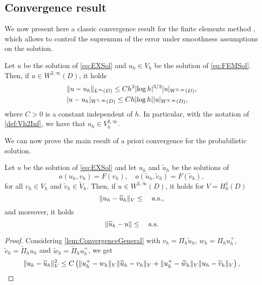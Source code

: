 \subsection{Convergence result}

We now present here a classic convergence result for the finite elements method \cite[Theorem 3.3.7]{Cia02}, which allows to control the supremum of the error under smoothness assumptions on the solution.
\begin{theorem}\label{thm:CiarletUniform} Let $u$ be the solution of \eqref{eq:EXSol} and $u_h \in V_h$ be the solution of \eqref{eq:FEMSol}. Then, if $u \in W^{2, \infty}(D)$, it holds
	\begin{equation}\label{eq:W1InfErr}
	\begin{aligned}
	&\lVert u - u_h\rVert_{L^\infty(D)} \leq C h^2 \lvert\log h\rvert^{3/2} \lvert u\rvert_{W^{2, \infty}(D)}, \\
	&\lvert u - u_h\rvert_{W^{1, \infty}(D)} \leq C h \lvert\log h\rvert \lvert u\rvert_{W^{2, \infty}(D)},
	\end{aligned}
	\end{equation}
	where $C > 0$ is a constant independent of $h$. In particular, with the notation of \cref{def:Vh2Inf}, we have that $u_h \in V_h^{2, \infty}$.
\end{theorem}

We can now prove the main result of a priori convergence for the probabilistic solution.
\begin{theorem}\label{thm:APriori} Let $u$ be the solution of \eqref{eq:EXSol} and let $u_h$ and $\widetilde u_h$ be the solutions of
	\begin{equation}
		a(u_h, v_h) = F(v_h), \quad a(\widetilde u_h, \widetilde v_h) = F(\widetilde v_h),
	\end{equation}
	for all $v_h \in V_h$ and $\widetilde v_h \in \widetilde V_h$. Then, if $u \in W^{2, \infty}(D)$, it holds for $V = H^1_0(D)$
	\begin{equation}
		\lVert u_h - \widetilde u_h\rVert_V \leq \quad \text{a.s.},
	\end{equation}
	and moreover, it holds
	\begin{equation}
		\lVert\widetilde u_h - u\rVert \leq \quad \text{a.s.}
	\end{equation}
\end{theorem}
\begin{proof} Considering \cref{lem:ConvergenceGeneral} with $v_h = \Pi_h \widetilde u_h$, $w_h = \Pi_h u_h^+$, $\widetilde v_h = \widetilde \Pi_h u_h$ and $\widetilde w_h = \widetilde \Pi_h u_h^+$, we get
	\begin{equation}
		\lVert u_h - \widetilde u_h\rVert_V^2 \leq C \left(\lVert u_h^+ - w_h\rVert_V \lVert\widetilde u_h - v_h\rVert_V + \lVert u_h^+ - \widetilde w_h\rVert_V \lVert u_h - \widetilde v_h\rVert_V \right),
	\end{equation}
\end{proof}

